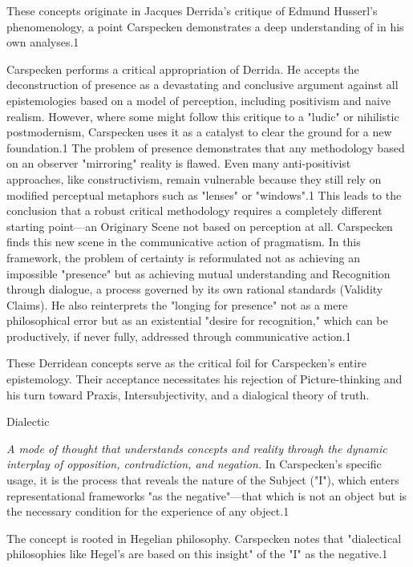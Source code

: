 \documentclass{book}
\begin{document}
These concepts originate in Jacques Derrida's critique of Edmund Husserl's phenomenology, a point Carspecken demonstrates a deep understanding of in his own analyses.1

Carspecken performs a critical appropriation of Derrida. He accepts the deconstruction of presence as a devastating and conclusive argument against all epistemologies based on a model of perception, including positivism and naive realism. However, where some might follow this critique to a "ludic" or nihilistic postmodernism, Carspecken uses it as a catalyst to clear the ground for a new foundation.1 The problem of presence demonstrates that any methodology based on an observer "mirroring" reality is flawed. Even many anti-positivist approaches, like constructivism, remain vulnerable because they still rely on modified perceptual metaphors such as "lenses" or "windows".1 This leads to the conclusion that a robust critical methodology requires a completely different starting point—an Originary Scene not based on perception at all. Carspecken finds this new scene in the communicative action of pragmatism. In this framework, the problem of certainty is reformulated not as achieving an impossible "presence" but as achieving mutual understanding and Recognition through dialogue, a process governed by its own rational standards (Validity Claims). He also reinterprets the "longing for presence" not as a mere philosophical error but as an existential "desire for recognition," which can be productively, if never fully, addressed through communicative action.1

These Derridean concepts serve as the critical foil for Carspecken's entire epistemology. Their acceptance necessitates his rejection of Picture-thinking and his turn toward Praxis, Intersubjectivity, and a dialogical theory of truth.

\parencite{Carspecken1999}

Dialectic

\textit{A mode of thought that understands concepts and reality through the dynamic interplay of opposition, contradiction, and negation.} In Carspecken's specific usage, it is the process that reveals the nature of the Subject ("I"), which enters representational frameworks "as the negative"—that which is not an object but is the necessary condition for the experience of any object.1

The concept is rooted in Hegelian philosophy. Carspecken notes that "dialectical philosophies like Hegel's are based on this insight" of the "I" as the negative.1
\end{document}
